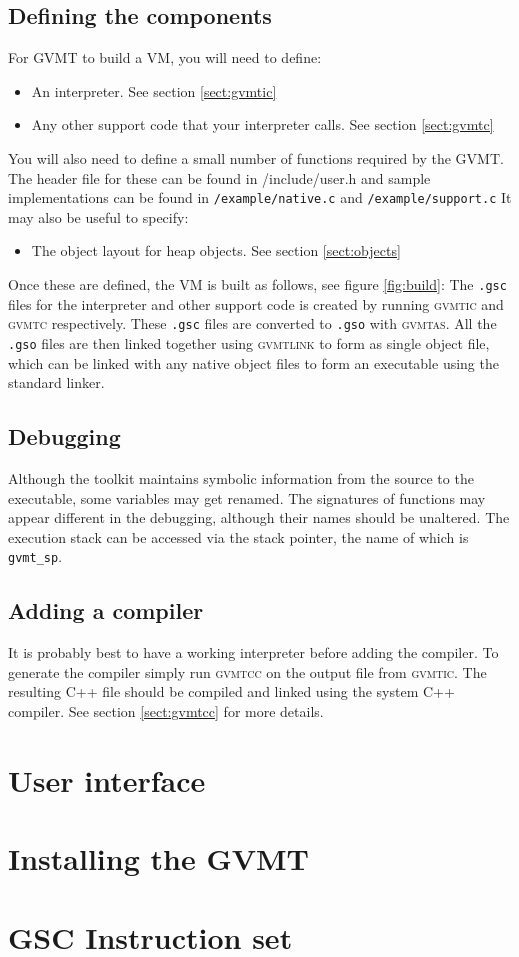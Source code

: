 \documentclass[a4paper,12pt]{report}
\newcommand{\gvmtic}{\textsc{gvmtic}}
\newcommand{\gvmtc}{\textsc{gvmtc}}
\newcommand{\glink}{\textsc{gvmtlink}}
\newcommand{\gvmtas}{\textsc{gvmtas}}
\newcommand{\gvmtcc}{\textsc{gvmtcc}}
\begin{document}
\section{Defining the components}
For GVMT to build a VM, you will need to define:
\begin{itemize}
\item An interpreter. See section \ref{sect:gvmtic}
\item Any other support code that your interpreter calls. See section \ref{sect:gvmtc}
\end{itemize}
You will also need to define a small number of functions required by the GVMT. The header file for these can be found in /include/user.h and sample implementations can be found in \verb|/example/native.c| and \verb|/example/support.c|
It may also be useful to specify:
\begin{itemize}
\item The object layout for heap objects. See section \ref{sect:objects}
\end{itemize}

Once these are defined, the VM is built as follows, see figure \ref{fig:build}: The \verb|.gsc| files for the interpreter and other support code is created by running \gvmtic{} and \gvmtc{} respectively. These  \verb|.gsc| files are converted to \verb|.gso| with \gvmtas. All the  \verb|.gso| files are then linked together using \glink{} to form as single object file, which can be linked with any native object files to form an executable using the standard linker.

\section{Debugging}
Although the toolkit maintains symbolic information from the source to the executable, some variables may get renamed. 
The signatures of functions may appear different in the debugging, although their names should be unaltered.
The execution stack can be accessed via the stack pointer, the name of which is \verb|gvmt_sp|.

\section{Adding a compiler}
It is probably best to have a working interpreter before adding the compiler. To generate the compiler simply run \gvmtcc{} on the output file from \gvmtic. The resulting C++ file should be compiled and linked using the system C++ compiler. See section \ref{sect:gvmtcc} for more details.

\chapter{User interface}


\appendix

\chapter{Installing the GVMT}



\chapter{GSC Instruction set\label{app:inst}}
\small


\end{document}
